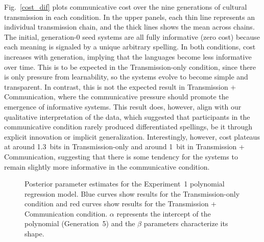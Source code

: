 \documentclass[doc,biblatex]{apa7}
\begin{document}
Fig.~\ref{cost_dif} plots communicative cost over the nine generations of cultural transmission in each condition. In the upper panels, each thin line represents an individual transmission chain, and the thick lines shows the mean across chains. The initial, generation-0 seed systems are all fully informative (zero cost) because each meaning is signaled by a unique arbitrary spelling. In both conditions, cost increases with generation, implying that the languages become less informative over time. This is to be expected in the Transmission-only condition, since there is only pressure from learnability, so the systems evolve to become simple and transparent. In contrast, this is not the expected result in Transmission + Communication, where the communicative pressure should promote the emergence of informative systems. This result does, however, align with our qualitative interpretation of the data, which suggested that participants in the communicative condition rarely produced differentiated spellings, be it through explicit innovation or implicit generalization. Interestingly, however, cost plateaus at around 1.3~bits in Transmission-only and around 1~bit in Transmission + Communication, suggesting that there is some tendency for the systems to remain slightly more informative in the communicative condition.

	\begin{figure}
	\vspace*{2pt}
	\caption{Posterior parameter estimates for the Experiment~1 polynomial regression model. Blue curves show results for the Transmission-only condition and red curves show results for the Transmission + Communication condition. $\alpha$ represents the intercept of the polynomial (Generation~5) and the $\beta$ parameters characterize its shape.}
	\label{posterior_dif}
	\end{figure}
\end{document}
